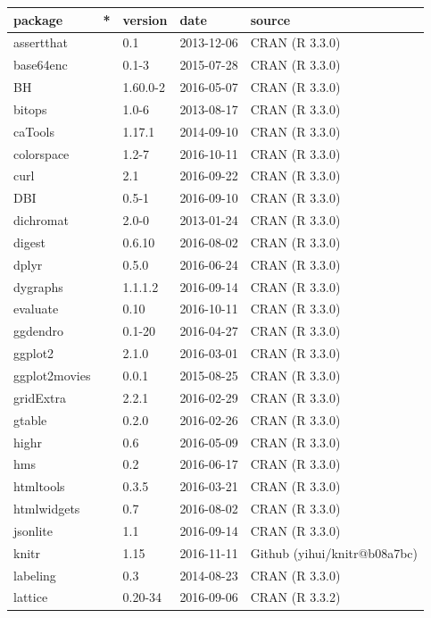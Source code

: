 \documentclass[]{tufte-book}
\begin{document}
\begin{longtable}{lllll}
\toprule
package & * & version & date & source\\
\midrule
assertthat &  & 0.1 & 2013-12-06 & CRAN (R 3.3.0)\\
base64enc &  & 0.1-3 & 2015-07-28 & CRAN (R 3.3.0)\\
BH &  & 1.60.0-2 & 2016-05-07 & CRAN (R 3.3.0)\\
bitops &  & 1.0-6 & 2013-08-17 & CRAN (R 3.3.0)\\
caTools &  & 1.17.1 & 2014-09-10 & CRAN (R 3.3.0)\\
\addlinespace
colorspace &  & 1.2-7 & 2016-10-11 & CRAN (R 3.3.0)\\
curl &  & 2.1 & 2016-09-22 & CRAN (R 3.3.0)\\
DBI &  & 0.5-1 & 2016-09-10 & CRAN (R 3.3.0)\\
dichromat &  & 2.0-0 & 2013-01-24 & CRAN (R 3.3.0)\\
digest &  & 0.6.10 & 2016-08-02 & CRAN (R 3.3.0)\\
\addlinespace
dplyr &  & 0.5.0 & 2016-06-24 & CRAN (R 3.3.0)\\
dygraphs &  & 1.1.1.2 & 2016-09-14 & CRAN (R 3.3.0)\\
evaluate &  & 0.10 & 2016-10-11 & CRAN (R 3.3.0)\\
ggdendro &  & 0.1-20 & 2016-04-27 & CRAN (R 3.3.0)\\
ggplot2 &  & 2.1.0 & 2016-03-01 & CRAN (R 3.3.0)\\
\addlinespace
ggplot2movies &  & 0.0.1 & 2015-08-25 & CRAN (R 3.3.0)\\
gridExtra &  & 2.2.1 & 2016-02-29 & CRAN (R 3.3.0)\\
gtable &  & 0.2.0 & 2016-02-26 & CRAN (R 3.3.0)\\
highr &  & 0.6 & 2016-05-09 & CRAN (R 3.3.0)\\
hms &  & 0.2 & 2016-06-17 & CRAN (R 3.3.0)\\
\addlinespace
htmltools &  & 0.3.5 & 2016-03-21 & CRAN (R 3.3.0)\\
htmlwidgets &  & 0.7 & 2016-08-02 & CRAN (R 3.3.0)\\
jsonlite &  & 1.1 & 2016-09-14 & CRAN (R 3.3.0)\\
knitr &  & 1.15 & 2016-11-11 & Github (yihui/knitr@b08a7bc)\\
labeling &  & 0.3 & 2014-08-23 & CRAN (R 3.3.0)\\
\addlinespace
lattice &  & 0.20-34 & 2016-09-06 & CRAN (R 3.3.2)\\

\end{longtable}
\end{document}
